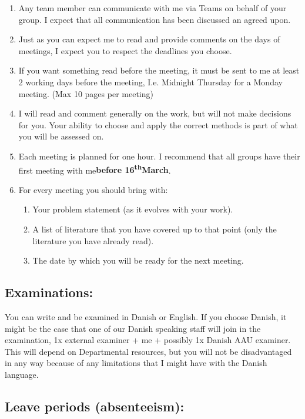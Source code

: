 \documentclass[10pt,twoside]{article}
\begin{document}
\begin{enumerate}
\def\labelenumi{\arabic{enumi}.}
\item
  Any team member can communicate with me via Teams on behalf of your
  group. I expect that all communication has been discussed an agreed
  upon.
\item
  Just as you can expect me to read and provide comments on the days of
  meetings, I expect you to respect the deadlines you choose.
\item
  If you want something read before the meeting, it must be sent to me
  at least 2 working days before the meeting, I.e. Midnight Thursday for
  a Monday meeting. (Max 10 pages per meeting)
\item
  I will read and comment generally on the work, but will not make
  decisions for you. Your ability to choose and apply the correct
  methods is part of what you will be assessed on.
\item
  Each meeting is planned for one hour. I recommend that all groups have
  their first meeting with me\textbf{before
  16\textsuperscript{th}March}.
\item
  For every meeting you should bring with:

  \begin{enumerate}
  \def\labelenumii{\alph{enumii}.}
  \item
    Your problem statement (as it evolves with your work).
  \item
    A list of literature that you have covered up to that point (only
    the literature you have already read).
  \item
    The date by which you will be ready for the next meeting.
  \end{enumerate}
\end{enumerate}

\hypertarget{examinations}{%
\subsection{Examinations:}\label{examinations}}

You can write and be examined in Danish or English. If you choose
Danish, it might be the case that one of our Danish speaking staff will
join in the examination, 1x external examiner + me + possibly 1x Danish
AAU examiner. This will depend on Departmental resources, but you will
not be disadvantaged in any way because of any limitations that I might
have with the Danish language.

\hypertarget{leave-periods-absenteeism}{%
\subsection{Leave periods
(absenteeism):}\label{leave-periods-absenteeism}}
\end{document}
